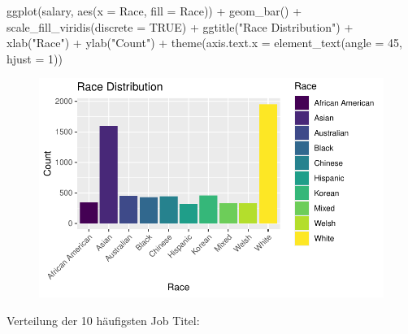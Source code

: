 \documentclass[
  letterpaper,
  DIV=11,
  numbers=noendperiod]{scrartcl}
\newenvironment{Shaded}{\begin{snugshade}}{\end{snugshade}}
\newcommand{\AttributeTok}[1]{\textcolor[rgb]{0.40,0.45,0.13}{#1}}
\newcommand{\ConstantTok}[1]{\textcolor[rgb]{0.56,0.35,0.01}{#1}}
\newcommand{\DecValTok}[1]{\textcolor[rgb]{0.68,0.00,0.00}{#1}}
\newcommand{\FunctionTok}[1]{\textcolor[rgb]{0.28,0.35,0.67}{#1}}
\newcommand{\NormalTok}[1]{\textcolor[rgb]{0.00,0.23,0.31}{#1}}
\newcommand{\SpecialCharTok}[1]{\textcolor[rgb]{0.37,0.37,0.37}{#1}}
\newcommand{\StringTok}[1]{\textcolor[rgb]{0.13,0.47,0.30}{#1}}
\begin{document}
\begin{Shaded}
\begin{Highlighting}[]
\FunctionTok{ggplot}\NormalTok{(salary, }\FunctionTok{aes}\NormalTok{(}\AttributeTok{x =}\NormalTok{ Race, }\AttributeTok{fill =}\NormalTok{ Race)) }\SpecialCharTok{+}
  \FunctionTok{geom\_bar}\NormalTok{() }\SpecialCharTok{+}
  \FunctionTok{scale\_fill\_viridis}\NormalTok{(}\AttributeTok{discrete =} \ConstantTok{TRUE}\NormalTok{) }\SpecialCharTok{+}
  \FunctionTok{ggtitle}\NormalTok{(}\StringTok{"Race Distribution"}\NormalTok{) }\SpecialCharTok{+}
  \FunctionTok{xlab}\NormalTok{(}\StringTok{"Race"}\NormalTok{) }\SpecialCharTok{+}
  \FunctionTok{ylab}\NormalTok{(}\StringTok{"Count"}\NormalTok{) }\SpecialCharTok{+}
  \FunctionTok{theme}\NormalTok{(}\AttributeTok{axis.text.x =} \FunctionTok{element\_text}\NormalTok{(}\AttributeTok{angle =} \DecValTok{45}\NormalTok{, }\AttributeTok{hjust =} \DecValTok{1}\NormalTok{))}
\end{Highlighting}
\end{Shaded}

\begin{figure}[H]

{\centering \includegraphics{main_doc_files/figure-pdf/unnamed-chunk-13-1.pdf}

}

\end{figure}

Verteilung der 10 häufigsten Job Titel:
\end{document}

